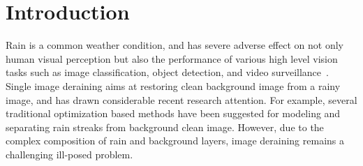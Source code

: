 \documentclass[10pt,twocolumn,letterpaper]{article}
\begin{document}
\section{Introduction}
Rain is a common weather condition, and has severe adverse effect on not only human visual perception but also the performance of various high level vision tasks such as image classification, object detection, and video surveillance~\cite{kang2012automatic,fu2018lightweight}.
Single image deraining aims at restoring clean background image from a rainy image, and has drawn considerable recent research attention.
For example, several traditional optimization based methods \cite{chen2013generalized,li2016rain,luo2015removing,gu2017joint} have been suggested for modeling and separating rain streaks from background clean image.
However, due to the complex composition of rain and background layers, image deraining remains a challenging ill-posed problem.
\end{document}
